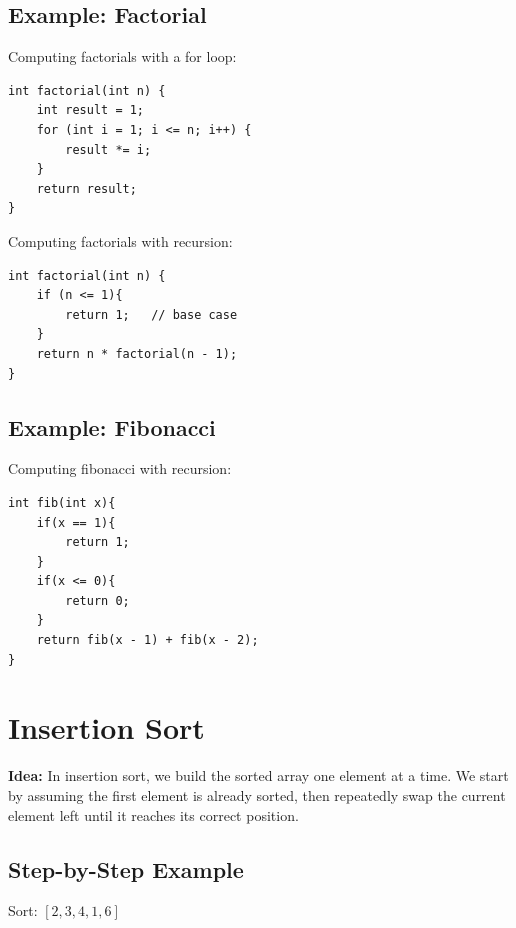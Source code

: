 \documentclass{article}
\begin{document}
\subsection{Example: Factorial}

Computing factorials with a for loop:
\begin{verbatim}
int factorial(int n) {
    int result = 1;
    for (int i = 1; i <= n; i++) {
        result *= i;
    }
    return result;
}
\end{verbatim}
Computing factorials with recursion:
\begin{verbatim}
int factorial(int n) {
    if (n <= 1){
        return 1;   // base case
    }
    return n * factorial(n - 1);
}
\end{verbatim}

\subsection{Example: Fibonacci}
Computing fibonacci with recursion:
\begin{verbatim}
int fib(int x){
    if(x == 1){
        return 1;
    }
    if(x <= 0){
        return 0;
    }
    return fib(x - 1) + fib(x - 2);
}
\end{verbatim}
\section{Insertion Sort}

\textbf{Idea:} In insertion sort, we build the sorted array one element at a time.
We start by assuming the first element is already sorted, then repeatedly swap the current element left
until it reaches its correct position.

\newpage
\subsection{Step-by-Step Example}
Sort: \([2,3,4,1,6]\)
\end{document}
